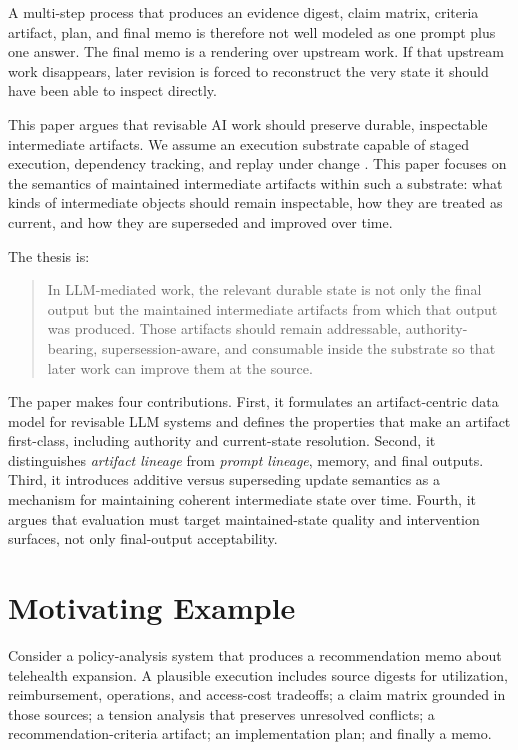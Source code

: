 \documentclass{article}
\begin{document}
A multi-step process that produces an evidence digest, claim matrix, criteria artifact, plan, and final memo is therefore not well modeled as one prompt plus one answer. The final memo is a rendering over upstream work. If that upstream work disappears, later revision is forced to reconstruct the very state it should have been able to inspect directly.

This paper argues that revisable AI work should preserve durable, inspectable intermediate artifacts. We assume an execution substrate capable of staged execution, dependency tracking, and replay under change \cite{rosen2026executionlineage}. This paper focuses on the semantics of maintained intermediate artifacts within such a substrate: what kinds of intermediate objects should remain inspectable, how they are treated as current, and how they are superseded and improved over time.

The thesis is:
\begin{quote}
In LLM-mediated work, the relevant durable state is not only the final output but the maintained intermediate artifacts from which that output was produced. Those artifacts should remain addressable, authority-bearing, supersession-aware, and consumable inside the substrate so that later work can improve them at the source.
\end{quote}

The paper makes four contributions. First, it formulates an artifact-centric data model for revisable LLM systems and defines the properties that make an artifact first-class, including authority and current-state resolution. Second, it distinguishes \emph{artifact lineage} from \emph{prompt lineage}, memory, and final outputs. Third, it introduces additive versus superseding update semantics as a mechanism for maintaining coherent intermediate state over time. Fourth, it argues that evaluation must target maintained-state quality and intervention surfaces, not only final-output acceptability.

\section{Motivating Example}

Consider a policy-analysis system that produces a recommendation memo about telehealth expansion. A plausible execution includes source digests for utilization, reimbursement, operations, and access-cost tradeoffs; a claim matrix grounded in those sources; a tension analysis that preserves unresolved conflicts; a recommendation-criteria artifact; an implementation plan; and finally a memo.
\end{document}

